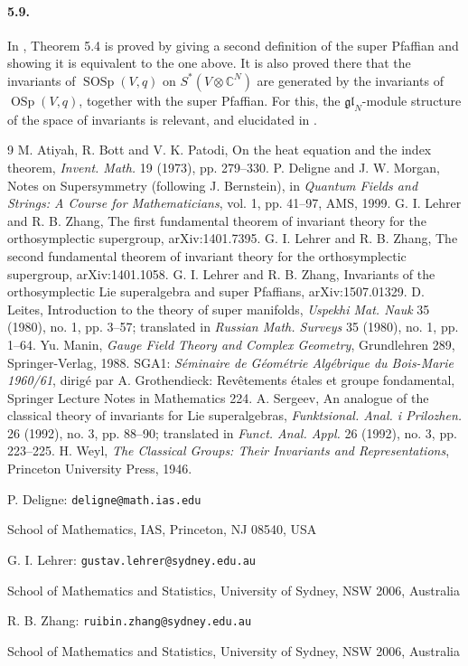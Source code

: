 \documentclass[11pt]{article}
\newcommand{\C}{\mathbb C}
\newcommand{\OSp}{\operatorname{OSp}}
\newcommand{\SOSp}{\operatorname{SOSp}}
\begin{document}
\paragraph{5.9.}
In \cite{LZ15}, Theorem 5.4 is proved by giving a second definition of the super Pfaffian and showing it is equivalent to the one above. It is also proved there that the invariants of $\SOSp(V,q)$ on $S^*(V\otimes\C^N)$ are generated by the invariants of $\OSp(V,q)$, together with the super Pfaffian. For this, the $\mathfrak{gl}_N$-module structure of the space of invariants is relevant, and elucidated in \cite{LZ15}.

\begin{thebibliography}{9}
 M. Atiyah, R. Bott and V. K. Patodi, On the heat equation and the index theorem, \emph{Invent. Math.} 19 (1973), pp. 279--330.
 P. Deligne and J. W. Morgan, Notes on Supersymmetry (following J. Bernstein), in \emph{Quantum Fields and Strings: A Course for Mathematicians}, vol. 1, pp. 41--97, AMS, 1999.
 G. I. Lehrer and R. B. Zhang, The first fundamental theorem of invariant theory for the orthosymplectic supergroup, arXiv:1401.7395.
 G. I. Lehrer and R. B. Zhang, The second fundamental theorem of invariant theory for the orthosymplectic supergroup, arXiv:1401.1058.
 G. I. Lehrer and R. B. Zhang, Invariants of the orthosymplectic Lie superalgebra and super Pfaffians, arXiv:1507.01329.
 D. Leites, Introduction to the theory of super manifolds, \emph{Uspekhi Mat. Nauk} 35 (1980), no. 1, pp. 3--57; translated in \emph{Russian Math. Surveys} 35 (1980), no. 1, pp. 1--64.
 Yu. Manin, \emph{Gauge Field Theory and Complex Geometry}, Grundlehren 289, Springer-Verlag, 1988.
 SGA1: \emph{Séminaire de Géométrie Algébrique du Bois-Marie 1960/61}, dirigé par A. Grothendieck: Revêtements étales et groupe fondamental, Springer Lecture Notes in Mathematics 224.
 A. Sergeev, An analogue of the classical theory of invariants for Lie superalgebras, \emph{Funktsional. Anal. i Prilozhen.} 26 (1992), no. 3, pp. 88--90; translated in \emph{Funct. Anal. Appl.} 26 (1992), no. 3, pp. 223--225.
 H. Weyl, \emph{The Classical Groups: Their Invariants and Representations}, Princeton University Press, 1946.
\end{thebibliography}

\vspace{1em}
\noindent P. Deligne: \texttt{deligne@math.ias.edu}\par
\noindent School of Mathematics, IAS, Princeton, NJ 08540, USA

\medskip
\noindent G. I. Lehrer: \texttt{gustav.lehrer@sydney.edu.au}\par
\noindent School of Mathematics and Statistics, University of Sydney, NSW 2006, Australia

\medskip
\noindent R. B. Zhang: \texttt{ruibin.zhang@sydney.edu.au}\par
\noindent School of Mathematics and Statistics, University of Sydney, NSW 2006, Australia
\end{document}
